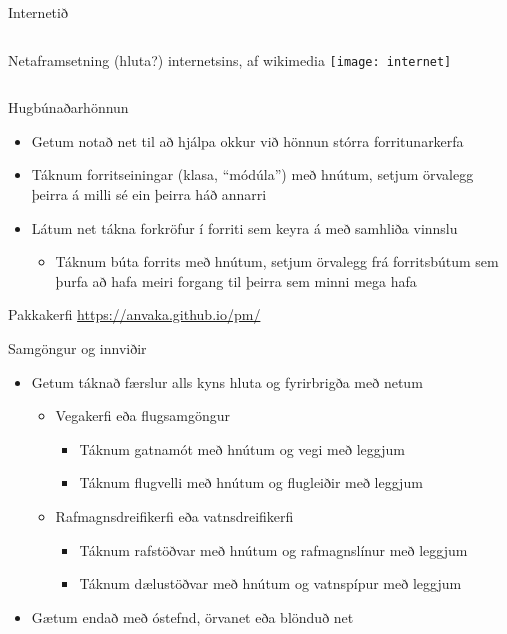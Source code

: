 \documentclass{beamer}
\begin{document}
\begin{frame}{Internetið}
\begin{columns}
Netaframsetning (hluta?) internetsins, af wikimedia
\texttt{[image: internet]}
\end{columns}
\end{frame}


\begin{frame}{Hugbúnaðarhönnun}
\begin{itemize}
 \item Getum notað net til að hjálpa okkur við hönnun stórra forritunarkerfa
 \item Táknum forritseiningar (klasa, ``módúla'') með hnútum, setjum örvalegg þeirra á milli sé ein þeirra háð annarri
 \item Látum net tákna forkröfur í forriti sem keyra á með samhliða vinnslu
 \begin{itemize}
  \item Táknum búta forrits með hnútum, setjum örvalegg frá forritsbútum sem þurfa að hafa meiri forgang til þeirra sem minni mega hafa
 \end{itemize}
\end{itemize}
\end{frame}

\begin{frame}{Pakkakerfi}
\url{https://anvaka.github.io/pm/}
\end{frame}

\begin{frame}{Samgöngur og innviðir}
\begin{itemize}
 \item Getum táknað færslur alls kyns hluta og fyrirbrigða með netum
 \begin{itemize}
  \item Vegakerfi eða flugsamgöngur
  \begin{itemize}
   \item Táknum gatnamót með hnútum og vegi með leggjum 
   \item Táknum flugvelli með hnútum og flugleiðir með leggjum
  \end{itemize}
  \item Rafmagnsdreifikerfi eða vatnsdreifikerfi
  \begin{itemize}
   \item Táknum rafstöðvar með hnútum og rafmagnslínur með leggjum
   \item Táknum dælustöðvar með hnútum og vatnspípur með leggjum
  \end{itemize}
 \end{itemize}
 \item Gætum endað með óstefnd, örvanet eða blönduð net
\end{itemize}
\end{frame}
\end{document}
